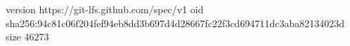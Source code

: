 version https://git-lfs.github.com/spec/v1
oid sha256:94c81c06f204fef94eb8dd3b697d4d28667fc22f3cd694711dc3aba82134023d
size 46273
